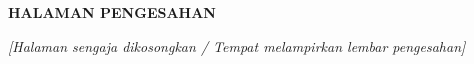 \clearpage
{}
{}
\begin{center}
    {\fontsize{14}{17}\selectfont\bfseries HALAMAN PENGESAHAN\par}
\end{center}
\vspace{2cm}
\begin{center}
    \textit{[Halaman sengaja dikosongkan / Tempat melampirkan lembar pengesahan]}
\end{center}
\clearpage
